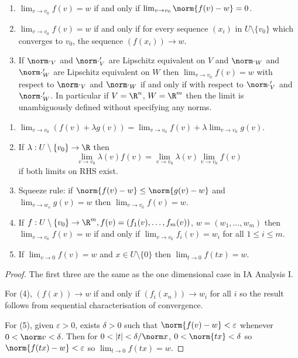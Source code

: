 \documentclass[a4paper]{article}
\theoremstyle{definition}
\begin{document}
\begin{note}\leavevmode
  \begin{enumerate}
  \item \(\lim_{v \to v_0} f(v) = w\) if and only if \(\lim_{v \to v_0} \norm{f(v) - w} = 0\).
  \item \(\lim_{v \to v_0} f(v) = w\) if and only if for every sequence \((x_i)\) in \(U\setminus\{v_0\}\) which converges to \(v_0\), the sequence \((f(x_i)) \to w\).
  \item If \(\norm \cdot_V\) and \(\norm \cdot_V'\) are Lipschitz equivalent on \(V\) and \(\norm \cdot_W\) and \(\norm \cdot_W'\) are Lipschitz equivalent on \(W\) then \(\lim_{v \to v_0} f(v) = w\) with respect to \(\norm \cdot_V\) and \(\norm \cdot_W\) if and only if with respect to \(\norm \cdot_V'\) and \(\norm \cdot_W'\). In particular if \(V = \R^n\), \(W = \R^m\) then the limit is unambiguously defined without specifying any norms.
  \end{enumerate}
\end{note}

\begin{proposition}\leavevmode
  \begin{enumerate}
  \item \(\lim_{v \to v_0} (f(v) + \lambda g(v)) = \lim_{v \to v_0} f(v) + \lambda \lim_{v \to v_0} g(v)\).
  \item If \(\lambda: U \setminus \{v_0\} \to \R\) then
    \[
      \lim_{v \to v_0} \lambda(v)f(v) = \lim_{v \to v_0}\lambda(v) \lim_{v \to v_0} f(v)
    \]
    if both limits on RHS exist.
  \item Squeeze rule: if \(\norm{f(v) - w} \leq \norm{g(v) -w}\) and \(\lim_{v \to w_o}g(v) = w\) then \(\lim_{v \to v_0} f(v) = w\).
  \item If \(f: U\setminus\{v_0\} \to \R^m, f(v) = (f_1(v), \dots, f_m(v))\), \(w = (w_1, \dots, w_m)\) then \(\lim_{v \to v_0} f(v) = w\) if and only if \(\lim_{v \to v_0} f_i(v) = w_i\) for all \(1 \leq i \leq m\).
  \item If \(\lim_{v \to 0} f(v) = w\) and \(x \in U\setminus\{0\}\) then \(\lim_{t \to 0} f(t x) = w\).
  \end{enumerate}
\end{proposition}

\begin{proof}
  The first three are the same as the one dimensional case in IA Analysis I.
  
  For (4), \((f(x)) \to w\) if and only if \((f_i(x_n)) \to w_i\) for all \(i\) so the result follows from sequential characterisation of convergence.

  For (5), given \(\varepsilon > 0\), exists \(\delta > 0\) such that \(\norm{f(v) - w} < \varepsilon\) whenever \(0 < \norm v < \delta\). Then for \(0 < |t| < \delta/\norm x\), \(0 < \norm{t x} < \delta\) so \(\norm{f(t x) - w} < \varepsilon\) so \(\lim_{t \to 0} f(t x) = w\).
\end{proof}
\end{document}
